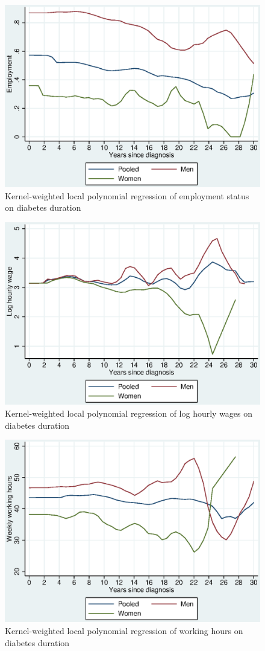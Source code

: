 \documentclass[12pt,english,british]{article}
\begin{document}
\begin{figure}[h!]
\caption{\label{fig:Kernel-weighted-local-polynomial_empl}Kernel-weighted local
polynomial regression of employment status on diabetes duration}%
\begin{center}
\includegraphics[width=0.5\columnwidth]{figures/lpoly_works_diabetesduration/lpoly_works_diabetesduration.eps}
\end{center}
\end{figure}

\begin{figure}[h!]
\caption{\label{fig:Kernel-weighted-local-polynomial_wage}Kernel-weighted local
polynomial regression of log hourly wages on diabetes duration}%
\begin{center}
\includegraphics[width=0.5\columnwidth]{figures/lpoly_wage_diabetesduration/lpoly_wage_diabetesduration.eps}
\end{center}
\end{figure}

\begin{figure}[h!]
\caption{\label{fig:Kernel-weighted-local-polynomial_workhrs}Kernel-weighted local
polynomial regression of working hours on diabetes duration}%
\begin{center}
\includegraphics[width=0.5\columnwidth]{figures/lpoly_workhrs_diabetesduration/lpoly_workhrs_diabetesduration.eps}
\end{center}
\end{figure}
\end{document}
